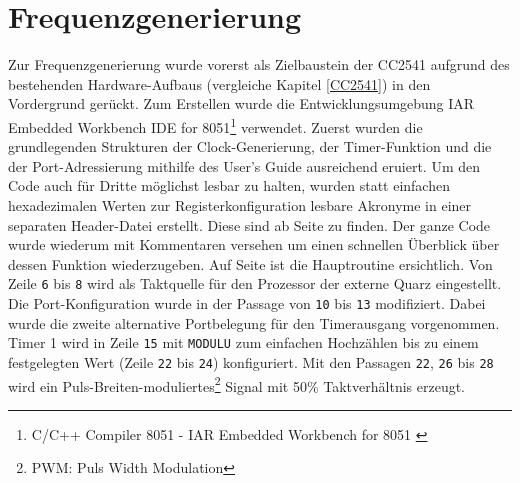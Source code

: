 \documentclass[12pt]{scrreprt} %
\begin{document}
\section{Frequenzgenerierung}
Zur Frequenzgenerierung wurde vorerst als Zielbaustein der CC2541 aufgrund des bestehenden Hardware-Aufbaus (vergleiche Kapitel \vref{CC2541}) in den Vordergrund gerückt. Zum Erstellen wurde die Entwicklungsumgebung IAR Embedded Workbench IDE for 8051\footnote{C/C++ Compiler 8051 - IAR Embedded Workbench for 8051 \citep{IAR}} verwendet. Zuerst wurden die grundlegenden Strukturen der Clock-Generierung, der Timer-Funktion und die der Port-Adressierung mithilfe des User's Guide \citep{CC2541_full} ausreichend eruiert. Um den Code auch für Dritte möglichst lesbar zu halten, wurden statt einfachen hexadezimalen Werten zur Registerkonfiguration lesbare Akronyme in einer separaten Header-Datei erstellt. Diese sind ab Seite \pageref{CC2541_porting_defines}zu finden. Der ganze Code wurde wiederum mit Kommentaren versehen um einen schnellen Überblick über dessen Funktion wiederzugeben. Auf Seite \pageref{CC2541_main} ist die Hauptroutine ersichtlich. Von Zeile \texttt{6} bis \texttt{8} wird als Taktquelle für den Prozessor der externe Quarz eingestellt. Die Port-Konfiguration wurde in der Passage von \texttt{10} bis \texttt{13} modifiziert. Dabei wurde die zweite alternative Portbelegung für den Timerausgang vorgenommen. Timer 1 wird in Zeile \texttt{15} mit \texttt{MODULU} zum einfachen Hochzählen bis zu einem festgelegten Wert (Zeile \texttt{22} bis \texttt{24}) konfiguriert. Mit den Passagen \texttt{22}, \texttt{26} bis \texttt{28} wird ein Puls-Breiten-moduliertes\footnote{PWM: Puls Width Modulation} Signal mit 50\% Taktverhältnis erzeugt. 
\newpage

\newpage

\end{document}
